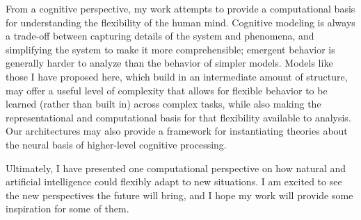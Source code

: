 From a cognitive perspective, my work attempts to provide a computational basis for understanding the flexibility of the human mind. Cognitive modeling is always a trade-off between capturing details of the system and phenomena, and simplifying the system to make it more comprehensible; emergent behavior is generally harder to analyze than the behavior of simpler models. Models like those I have proposed here, which build in an intermediate amount of structure, may offer a useful level of complexity that allows for flexible behavior to be learned (rather than built in) across complex tasks, while also making the representational and computational basis for that flexibility available to analysis. Our architectures may also provide a framework for instantiating theories about the neural basis of higher-level cognitive processing. \par 

Ultimately, I have presented one computational perspective on how natural and artificial intelligence could flexibly adapt to new situations. I am excited to see the new perspectives the future will bring, and I hope my work will provide some inspiration for some of them. 
